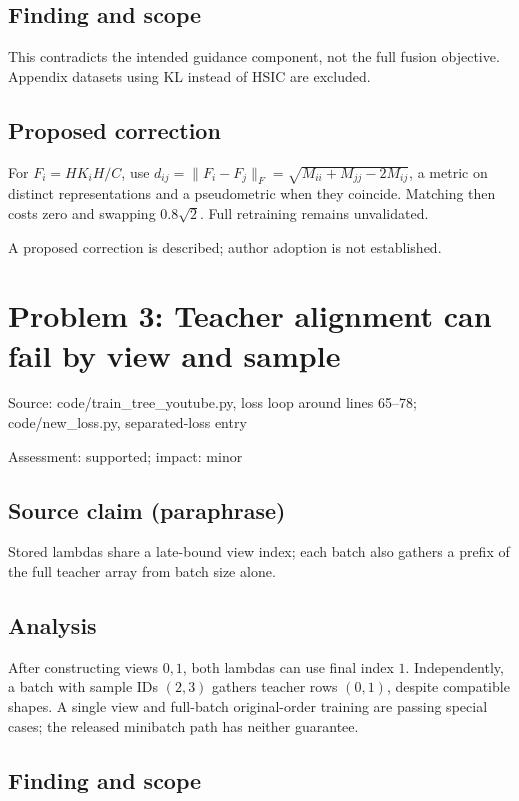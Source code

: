 \documentclass[11pt]{article}
\begin{document}
\subsection*{Finding and scope}

This contradicts the intended guidance component, not the full fusion objective. Appendix datasets using KL instead of HSIC are excluded.

\subsection*{Proposed correction}

For \(F_i=HK_iH/C\), use \(d_{ij}=\|F_i-F_j\|_F=\sqrt{M_{ii}+M_{jj}-2M_{ij}}\), a metric on distinct representations and a pseudometric when they coincide. Matching then costs zero and swapping \(0.8\sqrt2\). Full retraining remains unvalidated.

A proposed correction is described; author adoption is not established.

\section*{Problem 3: Teacher alignment can fail by view and sample}

Source: code/train\_tree\_youtube.py, loss loop around lines 65–78; code/new\_loss.py, separated-loss entry

Assessment: supported; impact: minor

\subsection*{Source claim (paraphrase)}

Stored lambdas share a late-bound view index; each batch also gathers a prefix of the full teacher array from batch size alone.

\subsection*{Analysis}

After constructing views \(0,1\), both lambdas can use final index \(1\). Independently, a batch with sample IDs \((2,3)\) gathers teacher rows \((0,1)\), despite compatible shapes. A single view and full-batch original-order training are passing special cases; the released minibatch path has neither guarantee.

\subsection*{Finding and scope}
\end{document}
